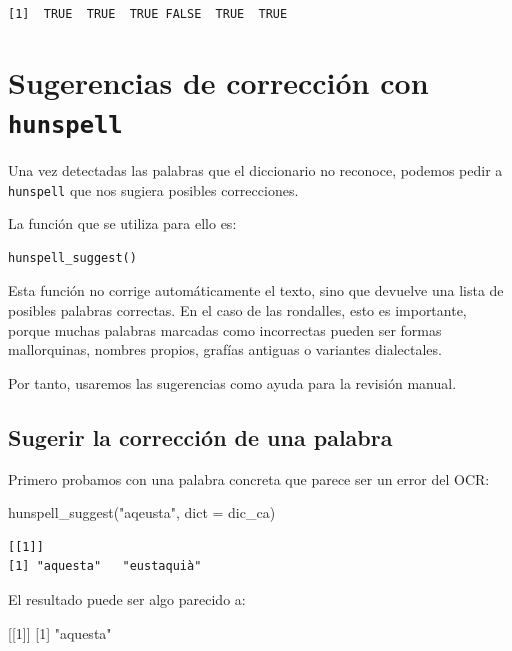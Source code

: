 \documentclass[
  letterpaper,
  DIV=11,
  numbers=noendperiod]{scrreprt}
\newenvironment{Shaded}{\begin{snugshade}}{\end{snugshade}}
\newcommand{\AttributeTok}[1]{\textcolor[rgb]{0.40,0.45,0.13}{#1}}
\newcommand{\DecValTok}[1]{\textcolor[rgb]{0.68,0.00,0.00}{#1}}
\newcommand{\FunctionTok}[1]{\textcolor[rgb]{0.28,0.35,0.67}{#1}}
\newcommand{\NormalTok}[1]{\textcolor[rgb]{0.00,0.23,0.31}{#1}}
\newcommand{\StringTok}[1]{\textcolor[rgb]{0.13,0.47,0.30}{#1}}
\begin{document}
\begin{verbatim}
[1]  TRUE  TRUE  TRUE FALSE  TRUE  TRUE
\end{verbatim}

\section{\texorpdfstring{Sugerencias de corrección con
\texttt{hunspell}}{Sugerencias de corrección con hunspell}}\label{sugerencias-de-correcciuxf3n-con-hunspell}

Una vez detectadas las palabras que el diccionario no reconoce, podemos
pedir a \texttt{hunspell} que nos sugiera posibles correcciones.

La función que se utiliza para ello es:

\begin{verbatim}
hunspell_suggest()
\end{verbatim}

Esta función no corrige automáticamente el texto, sino que devuelve una
lista de posibles palabras correctas. En el caso de las rondalles, esto
es importante, porque muchas palabras marcadas como incorrectas pueden
ser formas mallorquinas, nombres propios, grafías antiguas o variantes
dialectales.

Por tanto, usaremos las sugerencias como ayuda para la revisión manual.

\subsection{Sugerir la corrección de una
palabra}\label{sugerir-la-correcciuxf3n-de-una-palabra}

Primero probamos con una palabra concreta que parece ser un error del
OCR:

\begin{Shaded}
\begin{Highlighting}[]
\FunctionTok{hunspell\_suggest}\NormalTok{(}\StringTok{"aqeusta"}\NormalTok{, }\AttributeTok{dict =}\NormalTok{ dic\_ca)}
\end{Highlighting}
\end{Shaded}

\begin{verbatim}
[[1]]
[1] "aquesta"   "eustaquià"
\end{verbatim}

El resultado puede ser algo parecido a:

\begin{Shaded}
\begin{Highlighting}[]
\NormalTok{[[}\DecValTok{1}\NormalTok{]]}
\NormalTok{[}\DecValTok{1}\NormalTok{] }\StringTok{"aquesta"}
\end{Highlighting}
\end{Shaded}
\end{document}
